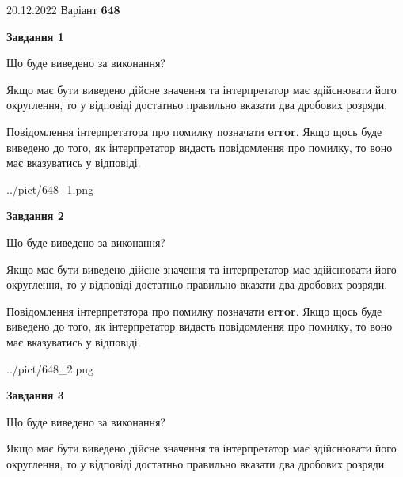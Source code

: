 \documentclass[12pt, ukrainian]{article}
\begin{document}
{20.12.2022 Варіант \No \textbf { 648 }\par}
{
\begin {Large}

{\begin {center}\textbf{Завдання 1}\end {center}}\par
Що буде виведено за виконання? \par

Якщо має бути виведено дійсне значення та інтерпретатор має здійснювати його округлення, 
то у відповіді достатньо правильно вказати два дробових розряди.

Повідомлення інтерпретатора про помилку позначати \textbf{error}.
Якщо щось буде виведено до того, як інтерпретатор видасть повідомлення про помилку, 
то воно має вказуватись у відповіді. \par

\begin{center}
	{../pict/648_1.png}
\end{center}
\newpage

{\begin {center}\textbf{Завдання 2}\end {center}}\par
Що буде виведено за виконання? \par

Якщо має бути виведено дійсне значення та інтерпретатор має здійснювати його округлення, 
то у відповіді достатньо правильно вказати два дробових розряди.

Повідомлення інтерпретатора про помилку позначати \textbf{error}.
Якщо щось буде виведено до того, як інтерпретатор видасть повідомлення про помилку, 
то воно має вказуватись у відповіді. \par

\begin{center}
	{../pict/648_2.png}
\end{center}
\newpage

{\begin {center}\textbf{Завдання 3}\end {center}}\par
Що буде виведено за виконання? \par

Якщо має бути виведено дійсне значення та інтерпретатор має здійснювати його округлення, 
то у відповіді достатньо правильно вказати два дробових розряди.


\end{Large}}
\end{document}
